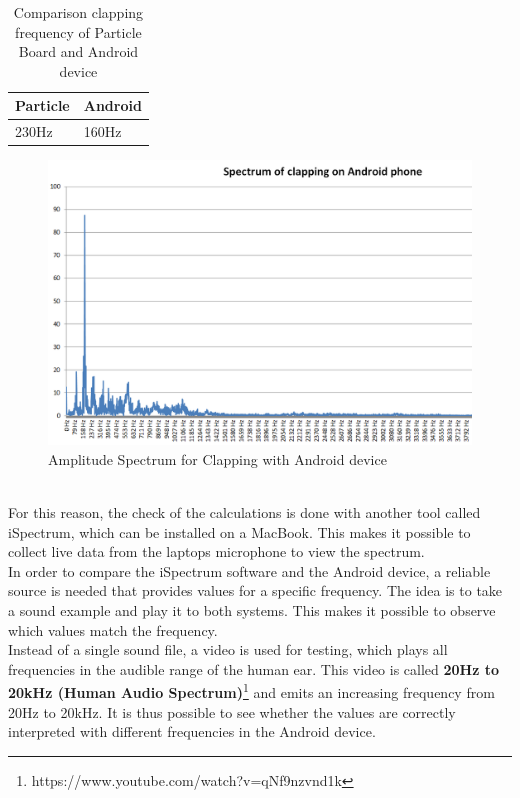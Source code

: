 \begin{table}[h]
	\centering
	\begin{tabular}{|l|l|}
		\hline
		\textbf{Particle} & \textbf{Android} \\
		\hline
		230Hz & 160Hz\\
		\hline
	\end{tabular}
\caption{Comparison clapping frequency of Particle Board and Android device}
\label{tab:comparisonParticleAndroid}
\end{table}
\begin{figure}[h]
	\centering
	\includegraphics[width=\textwidth]{imgs/clappingAndroid}
	\caption{Amplitude Spectrum for Clapping with Android device}
	\label{fig:clappingAndroid}
\end{figure}\\
For this reason, the check of the calculations is done with another tool called iSpectrum, which can be installed on a MacBook. This makes it possible to collect live data from the laptops microphone to view the spectrum. \\
In order to compare the iSpectrum software and the Android device, a reliable source is needed that provides values for a specific frequency. The idea is to take a sound example and play it to both systems. This makes it possible to observe which values match the frequency.
\\
Instead of a single sound file, a video is used for testing, which plays all frequencies in the audible range of the human ear. This video is called \textbf{20Hz to 20kHz (Human Audio Spectrum)}\footnote{https://www.youtube.com/watch?v=qNf9nzvnd1k} and emits an increasing frequency from 20Hz to 20kHz. It is thus possible to see whether the values are correctly interpreted with different frequencies in the Android device.
